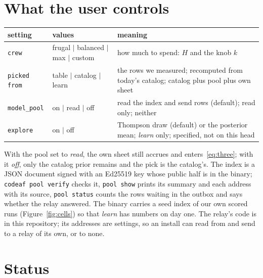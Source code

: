\documentclass[10pt,a4paper]{article}
\newcommand{\code}[1]{\texttt{#1}}
\theoremstyle{definition}
\theoremstyle{remark}
\begin{document}
\section{What the user controls}

\begin{center}\small
\begin{tabular}{p{2.1cm}p{4.3cm}p{8.0cm}}\toprule
setting & values & meaning\\\midrule
\code{crew} & frugal $\mid$ balanced $\mid$ max $\mid$ custom & how much to spend: $H$ and the knob $k$\\
\code{picked from} & table $\mid$ catalog $\mid$ learn & the rows we measured; recomputed from today's catalog; catalog plus pool plus own sheet\\
\code{model\_pool} & on $\mid$ read $\mid$ off & read the index and send rows (default); read only; neither\\
\code{explore} & on $\mid$ off & Thompson draw (default) or the posterior mean; \emph{learn} only; specified, not on this head\\
\bottomrule\end{tabular}
\end{center}

With the pool set to \emph{read}, the own sheet still accrues and enters~\eqref{eq:three}; with it \emph{off}, only the catalog prior remains and the pick is the catalog's. The index is a JSON document signed with an Ed25519 key whose public half is in the binary; \code{codeaf pool verify} checks it, \code{pool show} prints its summary and each address with its source, \code{pool status} counts the rows waiting in the outbox and says whether the relay answered. The binary carries a seed index of our own scored runs (Figure~\ref{fig:cells}) so that \emph{learn} has numbers on day one. The relay's code is in this repository; its addresses are settings, so an install can read from and send to a relay of its own, or to none.

\section{Status}
\end{document}
